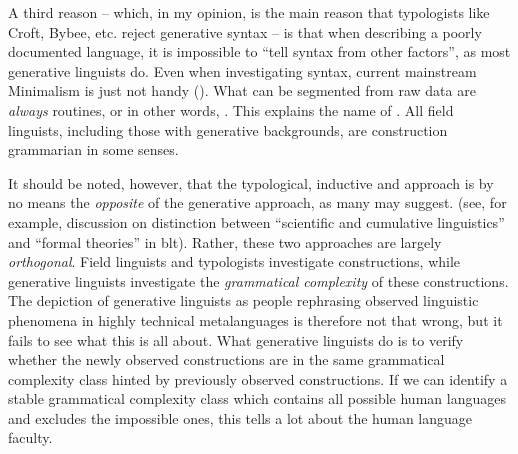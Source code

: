 \documentclass[../main.tex]{subfiles}
\begin{document}
A third reason -- which, in my opinion, is the main reason that 
typologists like Croft, Bybee, etc. reject generative syntax -- 
is that when describing a poorly documented language, 
it is impossible to ``tell syntax from other factors'', 
as most generative linguists do.
Even when investigating syntax,
current mainstream Minimalism is just not handy ().
What can be segmented from raw data are \emph{always} routines,
or in other words, .
This explains the name of \citet{croft2001radical}.
All field linguists, including those with generative backgrounds,
are construction grammarian in some senses.

It should be noted, however, that the typological, inductive and  approach
is by no means the \emph{opposite} of the generative approach, as many may suggest.
(see, for example, discussion on distinction between 
``scientific and cumulative linguistics'' and ``formal theories'' in \ac{blt}). 
Rather, these two approaches are largely \emph{orthogonal}.
Field linguists and typologists investigate constructions,
while generative linguists investigate the \emph{grammatical complexity} of these constructions.
The depiction of generative linguists as 
people rephrasing observed linguistic phenomena in highly technical metalanguages \citep{haspelmath2021}
is therefore not that wrong, 
but it fails to see what this is all about.
What generative linguists do is to verify 
whether the newly observed constructions are in the same grammatical complexity class 
hinted by previously observed constructions.
If we can identify a stable grammatical complexity class 
which contains all possible human languages and excludes the impossible ones,
this tells a lot about the human language faculty.
\end{document}
